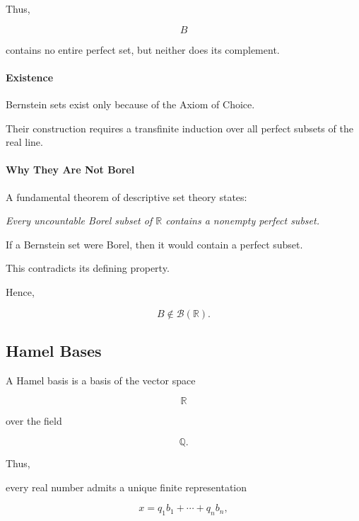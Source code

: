 \documentclass[11pt]{article}
\begin{document}
	Thus,
	
	\[
	B
	\]
	
	contains no entire perfect set, but neither does its complement.
	
	
	\paragraph{Existence}
	
	Bernstein sets exist only because of the Axiom of Choice.
	
	Their construction requires a transfinite induction over all perfect subsets
	of the real line.
	
	
	\paragraph{Why They Are Not Borel}
	
	A fundamental theorem of descriptive set theory states:
	
	\medskip
	
	\emph{Every uncountable Borel subset of $\mathbb R$ contains a nonempty
		perfect subset.}
	
	\medskip
	
	If a Bernstein set were Borel, then it would contain a perfect subset.
	
	This contradicts its defining property.
	
	Hence,
	
	\[
	\boxed{
		B
		\notin
		\mathcal B(\mathbb R).
	}
	\]
	
	
	\subsection{Hamel Bases}
	
	A Hamel basis is a basis of the vector space
	
	\[
	\mathbb R
	\]
	
	over the field
	
	\[
	\mathbb Q.
	\]
	
	Thus,
	
	every real number admits a unique finite representation
	
	\[
	x
	=
	q_1b_1+\cdots+q_nb_n,
	\]
	
\end{document}
